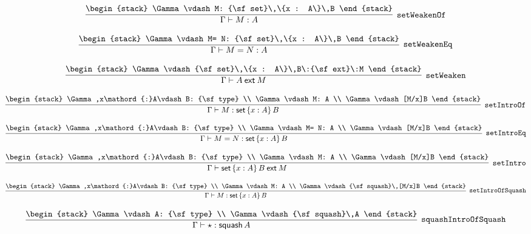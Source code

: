 \[
\infer[{\tt setWeakenOf}]{\Gamma \vdash M: A}{
\begin{stack}
\Gamma \vdash M: {\sf set}\,\{x : A\}\,B
\end{stack}}
\]

\[
\infer[{\tt setWeakenEq}]{\Gamma \vdash M= N: A}{
\begin{stack}
\Gamma \vdash M= N: {\sf set}\,\{x : A\}\,B
\end{stack}}
\]

\[
\infer[{\tt setWeaken}]{\Gamma \vdash A\:{\sf ext}\:M}{
\begin{stack}
\Gamma \vdash {\sf set}\,\{x : A\}\,B\:{\sf ext}\:M
\end{stack}}
\]

\[
\infer[{\tt setIntroOf}]{\Gamma \vdash M: {\sf set}\,\{x : A\}\,B}{
\begin{stack}
\Gamma ,x\mathord{:}A\vdash B: {\sf type}
\\
\Gamma \vdash M: A
\\
\Gamma \vdash [M/x]B
\end{stack}}
\]

\[
\infer[{\tt setIntroEq}]{\Gamma \vdash M= N: {\sf set}\,\{x : A\}\,B}{
\begin{stack}
\Gamma ,x\mathord{:}A\vdash B: {\sf type}
\\
\Gamma \vdash M= N: A
\\
\Gamma \vdash [M/x]B
\end{stack}}
\]

\[
\infer[{\tt setIntro}]{\Gamma \vdash {\sf set}\,\{x : A\}\,B\:{\sf ext}\:M}{
\begin{stack}
\Gamma ,x\mathord{:}A\vdash B: {\sf type}
\\
\Gamma \vdash M: A
\\
\Gamma \vdash [M/x]B
\end{stack}}
\]

\[
\infer[{\tt setIntroOfSquash}]{\Gamma \vdash M: {\sf set}\,\{x : A\}\,B}{
\begin{stack}
\Gamma ,x\mathord{:}A\vdash B: {\sf type}
\\
\Gamma \vdash M: A
\\
\Gamma \vdash {\sf squash}\,[M/x]B
\end{stack}}
\]

\[
\infer[{\tt squashIntroOfSquash}]{\Gamma \vdash \star : {\sf squash}\,A}{
\begin{stack}
\Gamma \vdash A: {\sf type}
\\
\Gamma \vdash {\sf squash}\,A
\end{stack}}
\]

